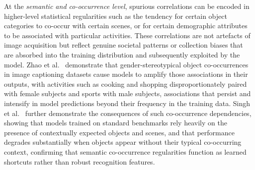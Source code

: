 At the \emph{semantic and co-occurrence level}, spurious correlations can be encoded in
higher-level statistical regularities such as the tendency for certain object categories to
co-occur with certain scenes, or for certain demographic attributes to be associated with
particular activities. These correlations are not artefacts of image acquisition but reflect
genuine societal patterns or collection biases that are absorbed into the training
distribution and subsequently exploited by the model. Zhao et
al.~\cite{Zhao_2017_MenAlsoLikeShopping} demonstrate that gender-stereotypical object
co-occurrences in image captioning datasets cause models to amplify those associations in
their outputs, with activities such as cooking and shopping disproportionately paired with
female subjects and sports with male subjects, associations that persist and intensify in
model predictions beyond their frequency in the training data. Singh et
al.~\cite{Singh_2020_DontJudgeObjectContext} further demonstrate the consequences of such
co-occurrence dependencies, showing that models trained on standard benchmarks rely heavily
on the presence of contextually expected objects and scenes, and that performance degrades
substantially when objects appear without their typical co-occurring context, confirming that
semantic co-occurrence regularities function as learned shortcuts rather than robust
recognition features.


